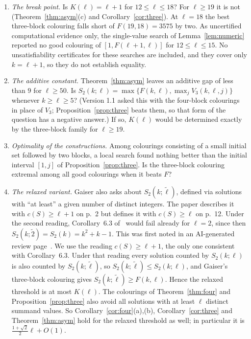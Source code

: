 \documentclass[11pt]{amsart}
\theoremstyle{definition}
\newcommand{\F}{F}
\newcommand{\Stwo}{S_2}
\begin{document}
\begin{enumerate}[label=\arabic*.]
\item \emph{The break point.} Is $K(\ell)=\ell+1$ for $12\le\ell\le18$? For $\ell\ge19$ it is not (Theorem~\ref{thm:asym}(c) and Corollary~\ref{cor:three}). At $\ell=18$ the best three-block colouring falls short of $\F(19,18)=3575$ by two. As uncertified computational evidence only, the single-value search of Lemma~\ref{lem:numeric} reported no good colouring of $[1,\F(\ell+1,\ell)]$ for $12\le\ell\le15$. No unsatisfiability certificates for these searches are included, and they cover only $k=\ell+1$, so they do not establish equality.
\item \emph{The additive constant.} Theorem~\ref{thm:asym} leaves an additive gap of less than $9$ for $\ell\ge50$. Is $\Stwo(k;\ell)=\max\{\F(k,\ell),\max_jV_3(k,\ell,j)\}$ whenever $k\ge\ell\ge5$? (Version 1.1 asked this with the four-block colourings in place of $V_3$; Proposition~\ref{prop:three} beats them, so that form of the question has a negative answer.) If so, $K(\ell)$ would be determined exactly by the three-block family for $\ell\ge19$.
\item \emph{Optimality of the constructions.} Among colourings consisting of a small initial set followed by two blocks, a local search found nothing better than the initial interval $[1,j]$ of Proposition~\ref{prop:three}. Is the three-block colouring extremal among all good colourings when it beats $\F$?
\item \emph{The relaxed variant.} Gaiser also asks about $\Stwo(k;\tilde\ell)$, defined via solutions with ``at least'' a given number of distinct integers. The paper describes it with $c(S)\ge\ell+1$ on p.~2 but defines it with $c(S)\ge\ell$ on p.~12. Under the second reading, Corollary~6.3 of~\cite{Gaiser} would fail already for $\ell=2$, since then $\Stwo(k;\tilde2)=S_2(k)=k^2+k-1$. This was first noted in an AI-generated review page~\cite{pith}. We use the reading $c(S)\ge\ell+1$, the only one consistent with Corollary~6.3. Under that reading every solution counted by $\Stwo(k;\ell)$ is also counted by $\Stwo(k;\tilde\ell)$, so $\Stwo(k;\tilde\ell)\le\Stwo(k;\ell)$, and Gaiser's three-block colouring gives $\Stwo(k;\tilde\ell)\ge\F(k,\ell)$. Hence the relaxed threshold is at most $K(\ell)$. The colourings of Theorem~\ref{thm:four} and Proposition~\ref{prop:three} also avoid all solutions with at least $\ell$ distinct summand values. So Corollary~\ref{cor:four}(a),(b), Corollary~\ref{cor:three} and Theorem~\ref{thm:asym} hold for the relaxed threshold as well; in particular it is $\frac{1+\sqrt2}{2}\ell+O(1)$.
\end{enumerate}
\end{document}
